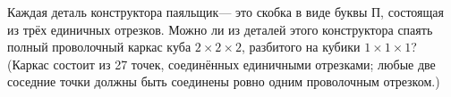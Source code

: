 Каждая деталь конструктора  паяльщик\guillemotright --- это скобка в виде буквы П, состоящая из трёх единичных отрезков. Можно ли из деталей этого конструктора спаять полный проволочный каркас куба $2 \times 2 \times 2$, разбитого на кубики $1 \times 1 \times 1$? (Каркас состоит из 27 точек, соединённых единичными отрезками; любые две соседние точки должны быть соединены ровно одним проволочным отрезком.)